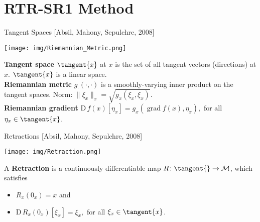 \documentclass{beamer}
\begin{document}
\section{RTR-SR1 Method}

\begin{frame}{Tangent Spaces}
    \vspace{-0.5\baselineskip}\hfill{\tiny{[Absil, Mahony, Sepulchre, 2008]}}
    \begin{center}
        \texttt{[image: img/Riemannian\_Metric.png]}
    \end{center}
    \textbf{Tangent space} $\tangent{x}$ at $x$ is the set of all tangent vectors (directions) at $x$. $\tangent{x}$ is a linear space. \\[0.2\baselineskip]
    \textbf{Riemannian metric} $g_{\cdot} (\cdot, \cdot)$ is a smoothly-varying inner product on the tangent spaces. Norm: $\lVert \xi_x \rVert_x = \sqrt{g_x(\xi_x, \xi_x)}$. \\[0.2\baselineskip]
    \textbf{Riemannian gradient} $\mathrm{D} \, f(x) [\eta_x] = g_x (\operatorname{grad} f(x), \eta_x),$ for all $\eta_x \in \tangent{x}$.
\end{frame}

\begin{frame}{Retractions}
    \vspace{-0.5\baselineskip}\hfill{\tiny{[Absil, Mahony, Sepulchre, 2008]}}
    \begin{center}
        \texttt{[image: img/Retraction.png]}
    \end{center}
    A \textbf{Retraction} is a continuously differentiable map $R \colon \tangent{} \to \mathcal{M}$, which satisfies \\[-0.1\baselineskip]
    \begin{itemize}
        \item $R_x (0_x) = x$ and
        \item $\mathrm{D} \, R_x (0_x)[\xi_x] = \xi_x,$ for all $\xi_x \in \tangent{x}$.
    \end{itemize}
\end{frame}
\end{document}
